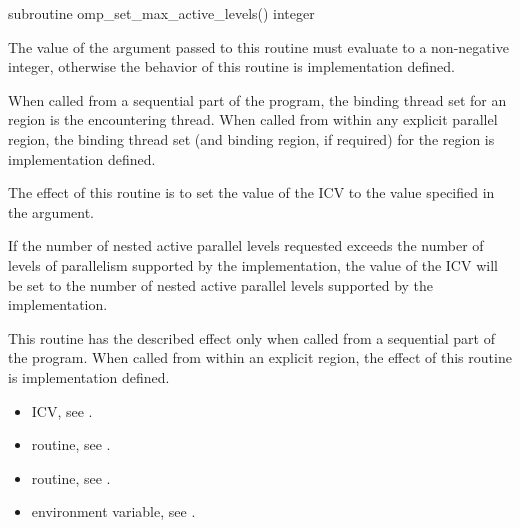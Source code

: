 \begin{fortranspecific}
\begin{ompfSubroutine}
subroutine omp_set_max_active_levels()
integer 
\end{ompfSubroutine}
\end{fortranspecific}

\constraints
The value of the argument passed to this routine must evaluate to a non-negative integer,
otherwise the behavior of this routine is implementation defined.

\binding
When called from a sequential part of the program, the binding thread set for an
 region is the encountering thread. When called
from within any explicit parallel region, the binding thread set (and binding region, if
required) for the  region is implementation defined.

\effect
The effect of this routine is to set the value of the  ICV to the value
specified in the argument.

If the number of nested active parallel levels requested exceeds the number of levels of parallelism
supported by the implementation, the value of the  ICV will be set
to the number of nested active parallel levels supported by the implementation.

This routine has the described effect only when called from a sequential part of the
program. When called from within an explicit  region, the effect of this
routine is implementation defined.

\crossreferences
\begin{itemize}
\item {} ICV, see
.

\item {} routine, see
.

\item {} routine, see
.

\item {} environment variable, see
.
\end{itemize}










